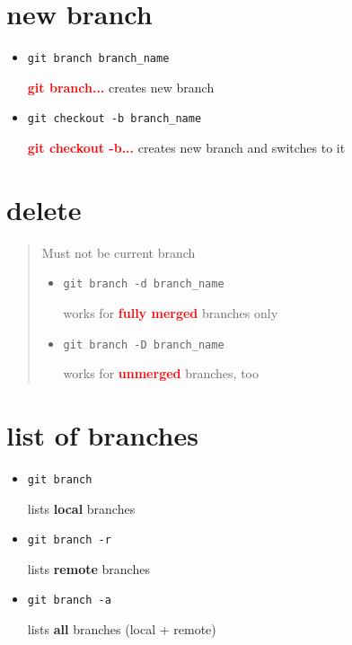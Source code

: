 \documentclass{report}
\begin{document}
\section{new branch}
\begin{itemize}

\item \begin{verbatim}
git branch branch_name
\end{verbatim}
\textcolor{red}{\textbf{git branch...}} creates new branch

\item \begin{verbatim}
git checkout -b branch_name
\end{verbatim}
\textcolor{red}{\textbf{git checkout -b...}} creates new branch and switches to it
 
\end{itemize}


\section{delete}
\begin{quote}
Must not be current branch
\begin{itemize}
\item \begin{verbatim}
git branch -d branch_name
\end{verbatim}
works for \textcolor{red}{\textbf{fully merged}} branches only

\item \begin{verbatim}
git branch -D branch_name
\end{verbatim}
works for \textcolor{red}{\textbf{unmerged}} branches, too
\end{itemize}

\end{quote}


\section{list of branches}
\begin{itemize}
\item \begin{verbatim}
git branch
\end{verbatim}
lists \textbf{local} branches

\item \begin{verbatim}
git branch -r
\end{verbatim}
lists \textbf{remote} branches

\item \begin{verbatim}
git branch -a
\end{verbatim}
lists \textbf{all} branches (local + remote)
\end{itemize}
\end{document}
